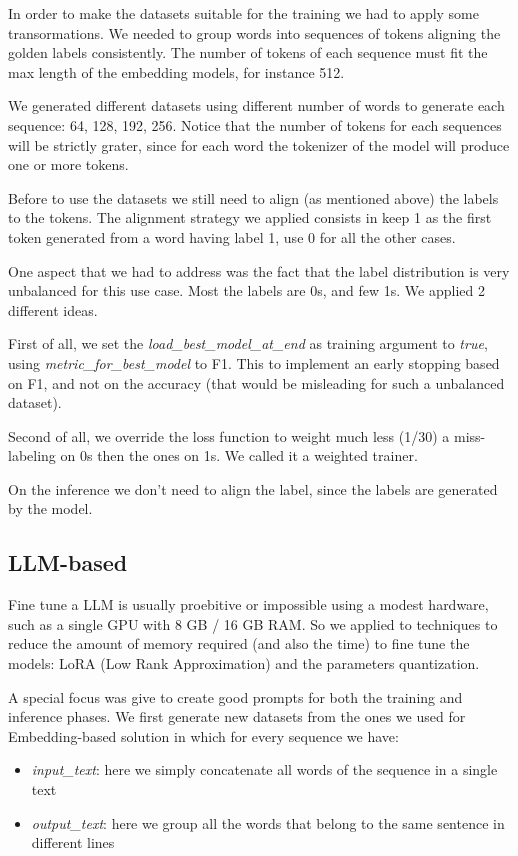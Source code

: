 \documentclass[11pt]{article}
\begin{document}
In order to make the datasets suitable for the training we had to apply some transormations. 
We needed to group words into sequences of tokens aligning the golden labels consistently.
The number of tokens of each sequence must fit the max length of the embedding models,
for instance 512.

We generated different datasets using different number of words to generate each sequence: 
64, 128, 192, 256. Notice that the number of tokens for each sequences will be strictly grater,
since for each word the tokenizer of the model will produce one or more tokens.

Before to use the datasets we still need to align (as mentioned above)  the labels to the tokens.
The alignment strategy we applied consists in keep 1 as the first token generated from a word
having label 1, use 0 for all the other cases.

One aspect that we had to address was the fact that the label distribution is very unbalanced
for this use case. Most the labels are 0s, and few 1s. We applied 2 different ideas.

First of all, we set the \emph{load\_best\_model\_at\_end} as training argument to \emph{true},
using \emph{metric\_for\_best\_model} to F1. This to implement an early stopping based on F1,
and not on the accuracy (that would be misleading for such a unbalanced dataset).

Second of all,  we override the loss function to weight much less (1/30) a miss-labeling on 0s then
the ones on 1s. We called it a weighted trainer. 

On the inference we don't need to align the label, since the labels are generated by the model.

\subsection{LLM-based}

Fine tune a LLM is usually proebitive or impossible using a modest hardware, such as a single GPU with 8 GB / 16 GB RAM. So we applied to techniques to reduce the amount of memory required (and also the time) to fine tune the models: LoRA (Low Rank Approximation) and the parameters quantization.

A special focus was give to create good prompts for both the training and inference phases.
We first generate new datasets from the ones we used for Embedding-based solution in which 
for every sequence we have:

 \begin{itemize}
 	\item \emph{input\_text}:  here we simply concatenate all words of the sequence in a single text
 	\item \emph{output\_text}: here we group all the words that belong to the same sentence in different lines
 \end{itemize}
 
\end{document}
